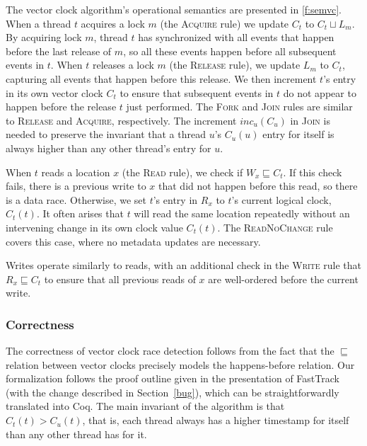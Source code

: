 \documentclass[preprint, 10pt]{sigplanconf}
\newcommand{\Tid}{t}
\newcommand{\TidU}{u}
\newcommand{\Address}{x}
\newcommand{\Lock}{m}
\newcommand{\VCFont}{}
\newcommand{\ThreadVC}[1]{\VCFont{C}_{#1}}
\newcommand{\LockVC}[1]{\VCFont{L}_{#1}}
\newcommand{\ReadVC}[1]{\VCFont{R}_{#1}}
\newcommand{\WriteVC}[1]{\VCFont{W}_{#1}}
\newcommand{\Rule}[1]{\textsc{#1}}
\newcommand{\VCMax}{\sqcup}
\newcommand{\VCCompare}{\sqsubseteq}
\begin{document}
The vector clock algorithm's operational semantics are presented in \autoref{f:semvc}. When a thread $\Tid$ acquires a lock $\Lock$ (the \Rule{Acquire} rule) we update $\ThreadVC{\Tid}$ to $\ThreadVC{\Tid} \VCMax \LockVC{\Lock}$.  By acquiring lock $\Lock$, thread $\Tid$ has synchronized with all events that happen before the last release of $\Lock$, so all these events happen before all subsequent events in $\Tid$.  When $\Tid$ releases a lock $\Lock$ (the \Rule{Release} rule), we update $\LockVC{\Lock}$ to $\ThreadVC{\Tid}$, capturing all events that happen before this release.  We then increment $\Tid$'s entry in its own vector clock $\ThreadVC{\Tid}$ to ensure that subsequent events in $\Tid$ do not appear to happen before the release $\Tid$ just performed.  The \Rule{Fork} and \Rule{Join} rules are similar to \Rule{Release} and \Rule{Acquire}, respectively. The increment $inc_u(C_u)$ in \Rule{Join} is needed to preserve the invariant that a thread $\TidU$'s $\ThreadVC{\TidU}(u)$ entry for itself is always higher than any other thread's entry for $\TidU$.

When $\Tid$ reads a location $\Address$ (the \Rule{Read} rule), we check if $\WriteVC{\Address} \VCCompare \ThreadVC{\Tid}$.  If this check fails, there is a previous write to $\Address$ that did not happen before this read, so there is a data race.  Otherwise, we set $\Tid$'s entry in $\ReadVC{\Address}$ to $\Tid$'s current logical clock, $\ThreadVC{\Tid}(\Tid)$.  It often arises that $\Tid$ will read the same location repeatedly without an intervening change in its own clock value $\ThreadVC{\Tid}(\Tid)$. The \Rule{ReadNoChange} rule covers this case, where no metadata updates are necessary.

Writes operate similarly to reads, with an additional check in the \Rule{Write} rule that $\ReadVC{\Address} \VCCompare \ThreadVC{\Tid}$ to ensure that all previous reads of $\Address$ are well-ordered before the current write.


\subsubsection{Correctness}
The correctness of vector clock race detection follows from the fact that the $\sqsubseteq$ relation between vector clocks precisely models the happens-before relation. Our formalization follows the proof outline given in the presentation of FastTrack~\cite{fasttrack} (with the change described in Section~\ref{bug}), which can be straightforwardly translated into Coq. The main invariant of the algorithm is that $C_t(t) > C_u(t)$, that is, each thread always has a higher timestamp for itself than any other thread has for it.
\end{document}
